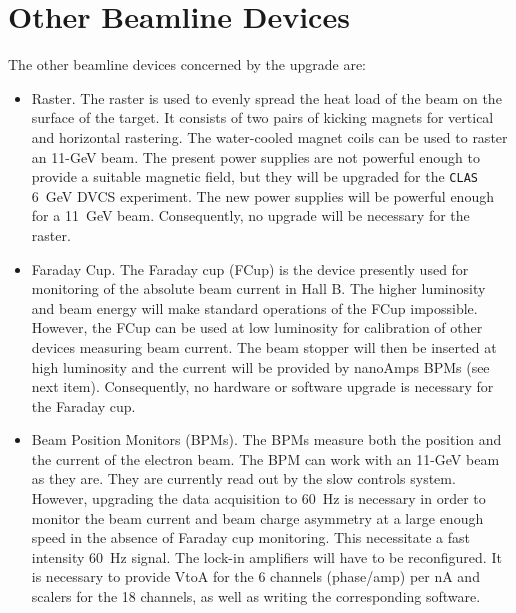 \section{Other Beamline Devices}

The other beamline devices concerned by the upgrade are:

\begin{itemize}

\item Raster. The raster is used to evenly spread the heat load of the beam
on the surface of the target. It consists of two pairs of kicking magnets
for vertical and horizontal rastering. The water-cooled magnet coils can be 
used to raster an 11-GeV beam. The present power supplies are not powerful 
enough to provide a suitable magnetic field, but they will be upgraded for 
the {\tt CLAS} 6~GeV DVCS experiment. The new power supplies will be 
powerful enough for a 11~GeV beam. Consequently, no upgrade will be 
necessary for the raster.

\item Faraday Cup. The Faraday cup (FCup) is the device presently used for 
monitoring of the absolute beam current in Hall B. The higher luminosity and
beam energy will make standard operations of the FCup impossible. However,
the FCup can be used at low luminosity for calibration of other devices
measuring beam current. The beam stopper will then be inserted at high
luminosity and the current will be provided by nanoAmps BPMs (see next
item). Consequently, no hardware or software upgrade is necessary for the 
Faraday cup. 

\item Beam Position Monitors (BPMs). The BPMs measure both the position and
the current of the electron beam. The BPM can work with an 11-GeV beam 
as they are. They are currently read out by the slow controls system. 
However, upgrading the data acquisition to 60~Hz is necessary in order to 
monitor the beam current and beam charge asymmetry at a large enough speed
in the absence of Faraday cup monitoring. This necessitate a fast intensity
60~Hz signal. The lock-in amplifiers will have to be reconfigured. It is
necessary to provide VtoA for the 6 channels (phase/amp) per nA and scalers
for the 18 channels, as well as writing the corresponding software.
\end{itemize}


